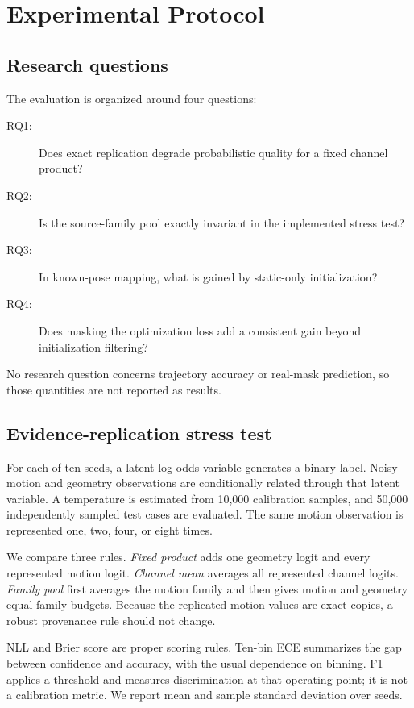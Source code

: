 \documentclass[10pt,conference]{IEEEtran}
\begin{document}
\section{Experimental Protocol}\label{sec:required}
\subsection{Research questions}
The evaluation is organized around four questions:
\begin{description}
\item[RQ1:] Does exact replication degrade probabilistic quality for a fixed channel product?
\item[RQ2:] Is the source-family pool exactly invariant in the implemented stress test?
\item[RQ3:] In known-pose mapping, what is gained by static-only initialization?
\item[RQ4:] Does masking the optimization loss add a consistent gain beyond initialization filtering?
\end{description}

No research question concerns trajectory accuracy or real-mask prediction, so those quantities are not reported as results.

\subsection{Evidence-replication stress test}
For each of ten seeds, a latent log-odds variable generates a binary label. Noisy motion and geometry observations are conditionally related through that latent variable. A temperature is estimated from 10,000 calibration samples, and 50,000 independently sampled test cases are evaluated. The same motion observation is represented one, two, four, or eight times.

We compare three rules. \textit{Fixed product} adds one geometry logit and every represented motion logit. \textit{Channel mean} averages all represented channel logits. \textit{Family pool} first averages the motion family and then gives motion and geometry equal family budgets. Because the replicated motion values are exact copies, a robust provenance rule should not change.

NLL and Brier score are proper scoring rules. Ten-bin ECE summarizes the gap between confidence and accuracy, with the usual dependence on binning. F1 applies a threshold and measures discrimination at that operating point; it is not a calibration metric. We report mean and sample standard deviation over seeds.
\end{document}
